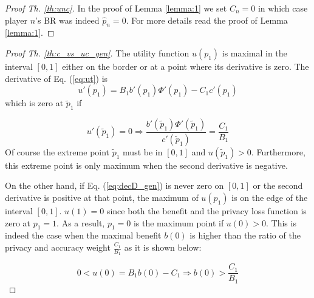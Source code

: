 \documentclass[USenglish,oneside,twocolumn]{article}
\theoremstyle{plain}
\begin{document}
\begin{appendices}
        \begin{proof}[Proof Th. \ref{th:unc}]
            In the proof of Lemma \ref{lemma:1} we set $C_n=0$ in which case player $n$'s BR was indeed $\hat{p}_n=0$. For more details read the proof of Lemma \ref{lemma:1}.
        \end{proof}
        
        \begin{proof}[Proof Th. \ref{th:c_vs_uc_gen}]
            The utility function $u(p_1)$ is maximal in the interval $[0,1]$ either on the border or at a point where its derivative is zero. The derivative of Eq. (\ref{eq:ut}) is
            \begin{equation}
            \label{eq:decD_gen}
            u'(p_1)=B_1b'(p_1)\Phi'(p_1)-C_1c'(p_1)
            \end{equation}
            which is zero at $\tilde{p}_1$ if 
            
            \begin{equation}
            u'(\tilde{p}_1)=0\Rightarrow\frac{b'(\tilde{p}_1)\Phi'(\tilde{p}_1)}{c'(\tilde{p}_1)}=\frac{C_1}{B_1}
            \end{equation}
            Of course the extreme point $\tilde{p}_1$ must be in $[0,1]$ and $u(\tilde{p}_1)>0$. Furthermore, this extreme point is only maximum when the second derivative is negative.
            
            On the other hand, if Eq. (\ref{eq:decD_gen}) is never zero on $[0,1]$ or the second derivative is positive at that point, the maximum of $u(p_1)$ is on the edge of the interval $[0,1]$. $u(1)=0$ since both the benefit and the privacy loss function is zero at $p_1=1$. As a result, $p_1=0$ is the maximum point if $u(0)>0$. This is indeed the case when the maximal benefit $b(0)$ is higher than the ratio of the privacy and accuracy weight $\frac{C_1}{B_1}$ as it is shown below:
            
            \begin{equation*}
            0<u(0)=B_1b(0)-C_1\Rightarrow b(0)>\frac{C_1}{B_1}
            \end{equation*}
        \end{proof}
        

\end{appendices}
\end{document}
